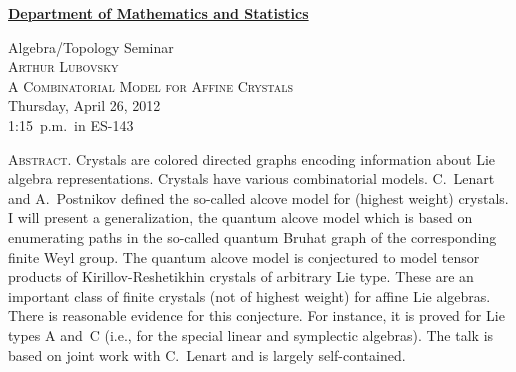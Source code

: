 \documentclass[12pt]{article}
\begin{document}
\noindent\hspace{-28pt}\raisebox{-19pt}{\XeTeXpicfile UAlogo.jpg scaled 340}%
\hfill\textsf{\textbf{\footnotesize\href{http://www.albany.edu/math/}{Department of Mathematics and Statistics}}}\bigskip\bigskip

\begin{center}\Large
  \textsf{\huge Algebra/Topology Seminar}\\[2.5\bigskipamount]
  \textsc{Arthur Lubovsky}\\[\bigskipamount]
  \textsc{A Combinatorial Model for Affine Crystals}\\[2\bigskipamount]
  Thursday, April 26, 2012\\ 1:15~p.m.\ in ES-143
\end{center}\bigskip\bigskip

\noindent\large\textsc{Abstract.}
Crystals are colored directed graphs encoding information about Lie algebra representations. Crystals have various combinatorial models. C.~Lenart and A.~Postnikov defined the so-called alcove model for (highest weight) crystals. I will present a generalization, the quantum alcove model which is based on enumerating paths in the so-called quantum Bruhat graph of the corresponding finite Weyl group. The quantum alcove model is conjectured to model tensor products of Kirillov-Reshetikhin crystals of arbitrary Lie type. These are an important class of finite crystals (not of highest weight) for affine Lie algebras. There is reasonable evidence for this conjecture. For instance, it is proved for Lie types A and~C (i.e., for the special linear and symplectic algebras). The talk is based on joint work with C.~Lenart and is largely self-contained.
\end{document}
